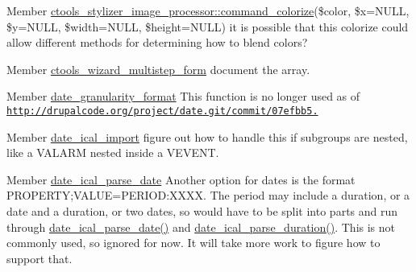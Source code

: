 \label{todo__todo000007}
\hypertarget{todo__todo000007}{}
 
\begin{DoxyDescription}
\item[Member \hyperlink{classctools__stylizer__image__processor_a1bb5df184af0c953ce5d12567ec4282f}{ctools\_\-stylizer\_\-image\_\-processor::command\_\-colorize}(\$color, \$x=NULL, \$y=NULL, \$width=NULL, \$height=NULL) ]it is possible that this colorize could allow different methods for determining how to blend colors? 
\end{DoxyDescription}

\label{todo__todo000008}
\hypertarget{todo__todo000008}{}
 
\begin{DoxyDescription}
\item[Member \hyperlink{wizard_8inc_a0b42108018cbf45ee377a2fbbe980716}{ctools\_\-wizard\_\-multistep\_\-form} ]document the array. 
\end{DoxyDescription}

\label{todo__todo000019}
\hypertarget{todo__todo000019}{}
 
\begin{DoxyDescription}
\item[Member \hyperlink{date__api_8module_ab17bb31df64a3d11cf8bddb49f5e20fd}{date\_\-granularity\_\-format} ]This function is no longer used as of \href{http://drupalcode.org/project/date.git/commit/07efbb5.}{\tt http://drupalcode.org/project/date.git/commit/07efbb5.} 
\end{DoxyDescription}

\label{todo__todo000021}
\hypertarget{todo__todo000021}{}
 
\begin{DoxyDescription}
\item[Member \hyperlink{date__api__ical_8inc_a9c32ef84b7717c5f5b9333a14aab9e17}{date\_\-ical\_\-import} ]figure out how to handle this if subgroups are nested, like a VALARM nested inside a VEVENT.


\end{DoxyDescription}

\label{todo__todo000022}
\hypertarget{todo__todo000022}{}
 
\begin{DoxyDescription}
\item[Member \hyperlink{date__api__ical_8inc_a043a6a7b1c9724a27cd16750f01492c4}{date\_\-ical\_\-parse\_\-date} ]Another option for dates is the format PROPERTY;VALUE=PERIOD:XXXX. The period may include a duration, or a date and a duration, or two dates, so would have to be split into parts and run through \hyperlink{date__api__ical_8inc_a043a6a7b1c9724a27cd16750f01492c4}{date\_\-ical\_\-parse\_\-date()} and \hyperlink{date__api__ical_8inc_a8a63c8aa2158e701b01217637169440d}{date\_\-ical\_\-parse\_\-duration()}. This is not commonly used, so ignored for now. It will take more work to figure how to support that. 
\end{DoxyDescription}

